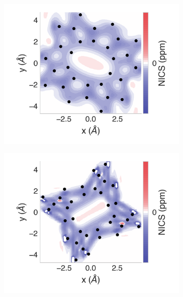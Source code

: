 \documentclass[
	fontsize=10pt, %
	twoside=true, %
	numbers=noenddot, %
]{kaobook}
\begin{document}
\begin{figure}[h]
\begin{subfigure}{5.5cm}\centering\includegraphics{asn10-2d}\end{subfigure}%
\begin{subfigure}{5.5cm}\centering\includegraphics{asn12-2d}\end{subfigure}

\end{figure}
\end{document}
